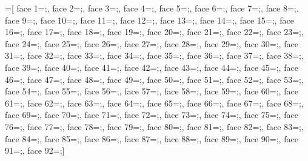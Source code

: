 =[%
	face 1={;},
	face 2={;},
	face 3={;},
	face 4={;},
	face 5={;},
	face 6={;},
	face 7={;},
	face 8={;},
	face 9={;},
	face 10={;},
	face 11={;},
	face 12={;},
	face 13={;},
	face 14={;},
	face 15={;},
	face 16={;},
	face 17={;},
	face 18={;},
	face 19={;},
	face 20={;},
	face 21={;},
	face 22={;},
	face 23={;},
	face 24={;},
	face 25={;},
	face 26={;},
	face 27={;},
	face 28={;},
	face 29={;},
	face 30={;},
	face 31={;},
	face 32={;},
	face 33={;},
	face 34={;},
	face 35={;},
	face 36={;},
	face 37={;},
	face 38={;},
	face 39={;},
	face 40={;},
	face 41={;},
	face 42={;},
	face 43={;},
	face 44={;},
	face 45={;},
	face 46={;},
	face 47={;},
	face 48={;},
	face 49={;},
	face 50={;},
	face 51={;},
	face 52={;},
	face 53={;},
	face 54={;},
	face 55={;},
	face 56={;},
	face 57={;},
	face 58={;},
	face 59={;},
	face 60={;},
	face 61={;},
	face 62={;},
	face 63={;},
	face 64={;},
	face 65={;},
	face 66={;},
	face 67={;},
	face 68={;},
	face 69={;},
	face 70={;},
	face 71={;},
	face 72={;},
	face 73={;},
	face 74={;},
	face 75={;},
	face 76={;},
	face 77={;},
	face 78={;},
	face 79={;},
	face 80={;},
	face 81={;},
	face 82={;},
	face 83={;},
	face 84={;},
	face 85={;},
	face 86={;},
	face 87={;},
	face 88={;},
	face 89={;},
	face 90={;},
	face 91={;},
	face 92={;}]
        
        
